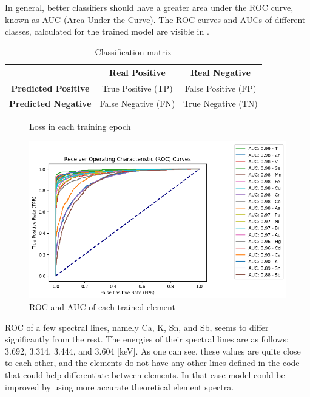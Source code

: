 In general, better classifiers should have a greater area under the ROC curve, known as AUC (Area Under the Curve). 
The ROC curves and AUCs of different classes, calculated for the trained model are visible in .

\begin{table}[htbp!]
  \centering
  \begin{tabular}{|c|c|c|}
    \hline
    & \textbf{Real Positive} & \textbf{Real Negative} \\
    \hline
    \textbf{Predicted Positive} & True Positive (TP) & False Positive (FP) \\
    \hline
    \textbf{Predicted Negative} & False Negative (FN) & True Negative (TN) \\
    \hline
  \end{tabular}
  \caption{Classification matrix}
  \label{tab:classification_matrix}
\end{table}

\begin{figure}[H]
  \centering
  
  \caption{Loss in each training epoch}
  \label{fig:vit-loss}
\end{figure}


\begin{figure}[htbp!]
  \centering
  \includegraphics[width=1\textwidth]{img/roc_auc.png}
  \caption{ROC and AUC of each trained element}
  \label{fig:roc-auc}
\end{figure}

ROC of a few spectral lines, namely Ca, K, Sn, and Sb, seems to differ significantly from the rest. 
The energies of their spectral lines are as follows: 3.692, 3.314, 3.444, and 3.604 [keV]. 
As one can see, these values are quite close to each other, and the elements do not have any other lines defined in the code that could help differentiate between elements.
In that case model could be improved by using more accurate theoretical element spectra. 


